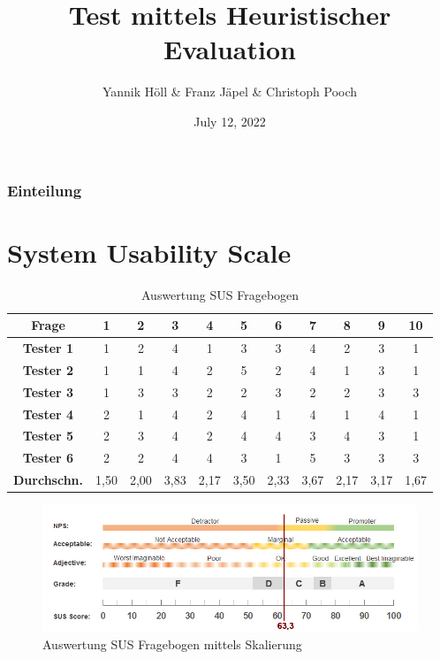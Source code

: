 \documentclass[12pt, aspectratio=169]{beamer}
\title{Test mittels Heuristischer Evaluation}
\author[Y. Höll, F. Jäpel, C. Pooch]{Yannik Höll \& Franz Jäpel \& Christoph Pooch}
\date{July 12, 2022}
\begin{document}
\begin{frame}
	\titlepage
\end{frame}

\begin{frame}
	\frametitle{Einteilung}
	\tableofcontents
\end{frame}

\section{System Usability Scale}
\begin{frame}
\begin{center}
	\begin{table}	
	\begin{tabular}{|c|c|c|c|c|c|c|c|c|c|c|}
	\hline
	\textbf{Frage}& \textbf{1}& \textbf{2} & \textbf{3} & \textbf{4} & \textbf{5} & \textbf{6} & \textbf{7} & \textbf{8} & \textbf{9} & \textbf{10} \\ \hline
	\textbf{Tester 1}&1	&2 &4 &1 &3	&3 &4 &2 &3	&1 \\ \hline
	\textbf{Tester 2}&1	&1 &4 &2 &5 &2 &4 &1 &3 &1 \\ \hline
	\textbf{Tester 3}&1	&3 &3 &2 &2 &3 &2 &2 &3 &3 \\ \hline
	\textbf{Tester 4}&2	&1 &4 &2 &4 &1 &4 &1 &4 &1 \\ \hline
	\textbf{Tester 5}&2	&3 &4 &2 &4 &4 &3 &4 &3 &1 \\ \hline
	\textbf{Tester 6}&2	&2 &4 &4 &3 &1 &5 &3 &3	&3 \\ \hline
	\textbf{Durchschn.}&1,50 &2,00 &3,83 &2,17 &3,50 &2,33 &3,67 &2,17 &3,17 &1,67 \\ \hline
		\end{tabular}
	\caption{Auswertung SUS Fragebogen}
	\end{table}
\end{center}
\end{frame}

\begin{frame}
	\begin{figure}	
		\includegraphics[width=1\textwidth]{image/sus-scale-nocorrect.png}
		\caption{Auswertung SUS Fragebogen mittels Skalierung}
	\end{figure}
\end{frame}
\end{document}
